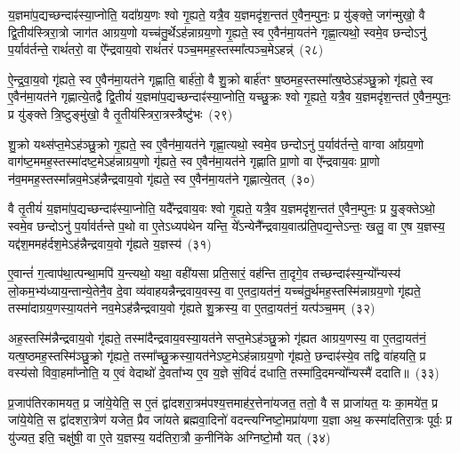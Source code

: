 य॒ज्ञमा॑प॒द्यच्छन्दाꣴ॑स्या॒प्नोति॒ यदा᳚ग्रय॒णः श्वो गृ॒ह्यते॒ यत्रै॒व य॒ज्ञमदृ॑श॒न्तत॑ ए॒वैन॒म्पुनः॒ प्र यु॑ङ्क्ते॒ जग॑न्मुखो॒ वै द्वि॒तीय॑स्त्रिरा॒त्रो जाग॑त आग्रय॒णो यच्च॑तु॒र्थे\-ऽह॑न्नाग्रय॒णो गृ॒ह्यते॒ स्व ए॒वैन॑मा॒यत॑ने गृह्णा॒त्यथो॒ स्वमे॒व छन्दो\-ऽनु॑ प॒र्याव॑र्तन्ते॒ राथं॑तरो॒ वा ऐ᳚न्द्रवाय॒वो राथं॑तरं पञ्च॒ममह॒स्तस्मा᳚त्पञ्च॒मे\-ऽहन्न्॑~(२८)

ऐ॒न्द्र॒वा॒य॒वो गृ॑ह्यते॒ स्व ए॒वैन॑मा॒यत॑ने गृह्णाति॒ बार्\mbox{}ह॑तो॒ वै शु॒क्रो बार्\mbox{}ह॑तꣳ ष॒ष्ठमह॒स्तस्मा᳚त्ष॒ष्ठे\-ऽह॑ञ्छु॒क्रो गृ॑ह्यते॒ स्व ए॒वैन॑मा॒यत॑ने गृह्णात्ये॒तद्वै द्वि॒तीयं॑ य॒ज्ञमा॑प॒द्यच्छन्दाꣴ॑स्या॒प्नोति॒ यच्छु॒क्रः श्वो गृ॒ह्यते॒ यत्रै॒व य॒ज्ञमदृ॑श॒न्तत॑ ए॒वैन॒म्पुनः॒ प्र यु॑ङ्क्ते त्रि॒ष्टुङ्मु॑खो॒ वै तृ॒तीय॑स्त्रिरा॒त्रस्त्रैष्टु॑भः~(२९)

शु॒क्रो यथ्स॑प्त॒मे\-ऽह॑ञ्छु॒क्रो गृ॒ह्यते॒ स्व ए॒वैन॑मा॒यत॑ने गृह्णा॒त्यथो॒ स्वमे॒व छन्दो\-ऽनु॑ प॒र्याव॑र्तन्ते॒ वाग्वा आ᳚ग्रय॒णो वाग॑ष्ट॒ममह॒स्तस्मा॑दष्ट॒मे\-ऽह॑न्नाग्रय॒णो गृ॑ह्यते॒ स्व ए॒वैन॑मा॒यत॑ने गृह्णाति प्रा॒णो वा ऐ᳚न्द्रवाय॒वः प्रा॒णो न॑व॒ममह॒स्तस्मा᳚न्नव॒मे\-ऽह॑न्नैन्द्रवाय॒वो गृ॑ह्यते॒ स्व ए॒वैन॑मा॒यत॑ने गृह्णात्ये॒तत्~(३०)

वै तृ॒तीयं॑ य॒ज्ञमा॑प॒द्यच्छन्दाꣴ॑स्या॒प्नोति॒ यदै᳚न्द्रवाय॒वः श्वो गृ॒ह्यते॒ यत्रै॒व य॒ज्ञमदृ॑श॒न्तत॑ ए॒वैन॒म्पुनः॒ प्र यु॒ङ्क्ते\-ऽथो॒ स्वमे॒व छन्दो\-ऽनु॑ प॒र्याव॑र्तन्ते प॒थो वा ए॒ते\-ऽध्यप॑थेन यन्ति॒ ये᳚\-ऽन्येनै᳚न्द्रवाय॒वात्प्र॑ति॒पद्य॒न्ते\-ऽन्तः॒ खलु॒ वा ए॒ष य॒ज्ञस्य॒ यद्द॑श॒ममह॑र्दश॒मे\-ऽह॑न्नैन्द्रवाय॒वो गृ॑ह्यते य॒ज्ञस्य॑~(३१)

ए॒वान्तं॑ ग॒त्वाप॑था॒त्पन्था॒मपि॑ य॒न्त्यथो॒ यथा॒ वही॑यसा प्रति॒सारं॒ वह॑न्ति ता॒दृगे॒व तच्छन्दाꣴ॑स्य॒न्यो᳚न्यस्य॑ लो॒कम॒भ्य॑ध्याय॒न्तान्ये॒तेनै॒व दे॒वा व्य॑वाहयन्नैन्द्रवाय॒वस्य॒ वा ए॒तदा॒यत॑नं॒ यच्च॑तु॒र्थमह॒स्तस्मि॑न्नाग्रय॒णो गृ॑ह्यते॒ तस्मा॑दाग्रय॒णस्या॒यत॑ने नव॒मे\-ऽह॑न्नैन्द्रवाय॒वो गृ॑ह्यते शु॒क्रस्य॒ वा ए॒तदा॒यत॑नं॒ यत्प॑ञ्च॒मम्~(३२)

अह॒स्तस्मि॑न्नैन्द्रवाय॒वो गृ॑ह्यते॒ तस्मा॑दैन्द्रवाय॒वस्या॒यत॑ने सप्त॒मे\-ऽह॑ञ्छु॒क्रो गृ॑ह्यत आग्रय॒णस्य॒ वा ए॒तदा॒यत॑नं॒ यत्ष॒ष्ठमह॒स्तस्मि॑ञ्छु॒क्रो गृ॑ह्यते॒ तस्मा᳚च्छु॒क्रस्या॒यत॑ने\-ऽष्ट॒मे\-ऽह॑न्नाग्रय॒णो गृ॑ह्यते॒ छन्दाꣴ॑स्ये॒व तद्वि वा॑हयति॒ प्र वस्य॑सो विवा॒हमा᳚प्नोति॒ य ए॒वं वेदाथो॑ दे॒वता᳚भ्य ए॒व य॒ज्ञे सं॒विदं॑ दधाति॒ तस्मा॑दि॒दमन्यो᳚न्यस्मै॑ ददाति॥~(३३)

{\anuvakamend[{ए॒तद्वै प॑ञ्च॒मे\-ऽह॒न्त्रैष्टु॑भ ए॒तद्गृ॑ह्यते य॒ज्ञस्य॑ प़ञ्च॒मम॒न्यस्मा॒ एक॑ञ्च}]}%

प्र॒जा\-प॑तिरकामयत॒ प्र जा॑ये॒येति॒ स ए॒तं द्वा॑दशरा॒त्रम॑पश्य॒त्तमाह॑र॒त्तेना॑यजत॒ ततो॒ वै स प्राजा॑यत॒ यः का॒मये॑त॒ प्र जा॑ये॒येति॒ स द्वा॑दशरा॒त्रेण॑ यजेत॒ प्रैव जा॑यते ब्रह्मवा॒दिनो॑ वदन्त्यग्निष्टो॒मप्रा॑यणा य॒ज्ञा अथ॒ कस्मा॑दतिरा॒त्रः पूर्वः॒ प्र यु॑ज्यत॒ इति॒ चक्षु॑षी॒ वा ए॒ते य॒ज्ञस्य॒ यद॑तिरा॒त्रौ क॒नीनि॑के अग्निष्टो॒मौ यत्~(३४)


